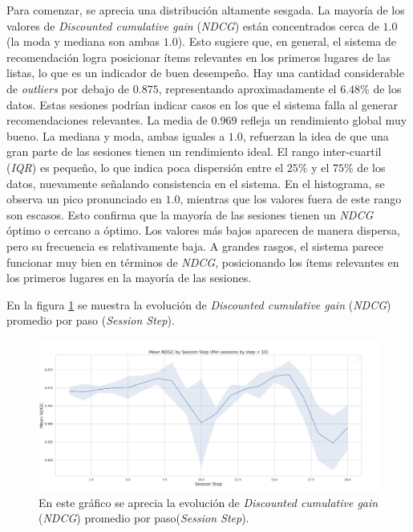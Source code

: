 \documentclass[11pt,a4paper,twoside]{thesis}
\begin{document}
Para comenzar, se aprecia una distribución altamente sesgada. La mayoría de los valores de \textit{Discounted cumulative gain} (\textit{NDCG}) están concentrados cerca de $1.0$ (la moda y mediana son ambas $1.0$). Esto sugiere que, en general, el sistema de recomendación logra posicionar ítems relevantes en los primeros lugares de las listas, lo que es un indicador de buen desempeño. Hay una cantidad considerable de \textit{outliers} por debajo de $0.875$, representando aproximadamente el $6.48\%$ de los datos.
Estas sesiones podrían indicar casos en los que el sistema falla al generar recomendaciones relevantes.
La media de $0.969$ refleja un rendimiento global muy bueno. La mediana y moda, ambas iguales a $1.0$, refuerzan la idea de que una gran parte de las sesiones tienen un rendimiento ideal. El rango inter-cuartil (\textit{IQR}) es pequeño, lo que indica poca dispersión entre el $25\%$ y el $75\%$ de los datos, nuevamente señalando consistencia en el sistema.
En el histograma, se observa un pico pronunciado en $1.0$, mientras que los valores fuera de este rango son escasos. Esto confirma que la mayoría de las sesiones tienen un \textit{NDCG} óptimo o cercano a óptimo. Los valores más bajos aparecen de manera dispersa, pero su frecuencia es relativamente baja. A grandes rasgos, el sistema parece funcionar muy bien en términos de \textit{NDCG}, posicionando los ítems relevantes en los primeros lugares en la mayoría de las sesiones.
\clearpage


En la figura \ref{fig:llama2-mean_ndgc_by_session_step} se muestra la evolución de \textit{Discounted cumulative gain} (\textit{NDCG}) promedio por paso (\textit{Session Step}).

\begin{figure}[htbp]
	\centering
	\includegraphics[width=15cm]{./images/llama2/mean_ndgc_by_session_step.png}
	\caption{En este gráfico se aprecia la evolución de \textit{Discounted cumulative gain} (\textit{NDCG}) promedio por paso(\textit{Session Step}).}
	\label{fig:llama2-mean_ndgc_by_session_step}
\end{figure}
\end{document}

